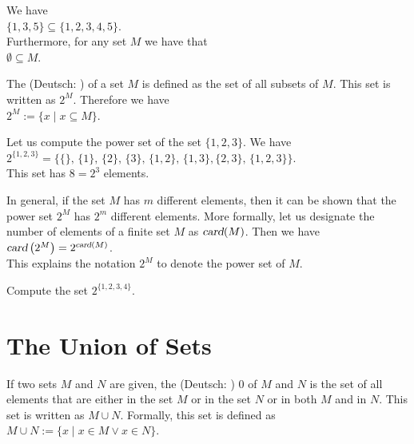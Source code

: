 \exampleEng
We have
\\[0.2cm]
\hspace*{1.3cm}
$\{ 1, 3, 5\} \subseteq \{ 1, 2, 3, 4, 5 \}$.
\\[0.2cm]
Furthermore, for any set $M$ we have that
\\[0.2cm]
\hspace*{1.3cm}
$\emptyset \subseteq M$. \eox
\vspace*{0.2cm}

The   (Deutsch: ) of a set $M$ is defined as the set of all subsets of $M$.  
 
This set is written as $2^M$.  Therefore we have
\\[0.2cm] 
\hspace*{1.3cm}
$2^M := \{ x \;|\; x \subseteq M \}$.

\exampleEng
Let us compute the power set of the set $\{1,2,3\}$.  We have \\[0.2cm]
\hspace*{1.3cm}
 $2^{\{1,2,3\}} = \bigl\{ \{\},\, \{1\}, \, \{2\},\, \{3\},\, \{1,2\}, \, \{1,3\}, \{2,3\}, \,\{1,2,3\}\bigr\}$. 
\\[0.2cm]
This set has $8 = 2^3$ elements.  
\eox

In general, if the set $M$ has $m$ different elements, then it can be shown
that the power set $2^M$ has $2^m$ different elements.
More formally, let us designate the number of elements of a finite set $M$ as 
$\textsl{card}(M)$.  Then we have
\\[0.2cm]
\hspace*{1.3cm}
$\textsl{card}\left(2^M\right) = 2^{\textsl{\scriptsize card}(M)}$.
\\[0.2cm]
This explains the notation $2^M$ to denote the power set of $M$.  

\exerciseEng
Compute the set $2^{\{1,2,3,4\}}$.  
\eox

\section{The Union of Sets}
If two sets $M$ and $N$ are given, the  (Deutsch: )
 0
of $M$ and $N$ is the set of all elements that are either in the set $M$ or in the set $N$ or in both $M$ and
in $N$.  This set is written as $M \cup N$.
Formally, this set is defined as 
\\[0.2cm]
\hspace*{1.3cm} $M \cup N := \{ x \;|\; x \in M \vee x \in N \}$. 

